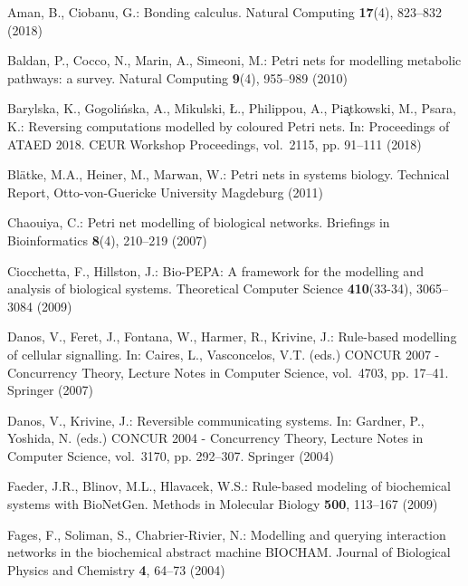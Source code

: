 \documentclass[runningheads]{llncs}
\begin{document}

\begin{thebibliography}{10}
\providecommand{\url}[1]{\texttt{#1}}
\providecommand{\urlprefix}{URL }
\providecommand{\doi}[1]{https://doi.org/#1}

Aman, B., Ciobanu, G.: Bonding calculus. Natural Computing  \textbf{17}(4),
  823--832 (2018)

Baldan, P., Cocco, N., Marin, A., Simeoni, M.: Petri nets for modelling
  metabolic pathways: a survey. Natural Computing  \textbf{9}(4),  955--989
  (2010)

Barylska, K., Gogoli\'{n}ska, A., Mikulski, {\L}., Philippou, A., Pi{\c
  a}tkowski, M., Psara, K.: Reversing computations modelled by coloured {P}etri
  nets. In: Proceedings of ATAED 2018. {CEUR} Workshop Proceedings, vol.~2115,
  pp. 91--111 (2018)

Bl{\"a}tke, M.A., Heiner, M., Marwan, W.: Petri nets in systems biology.
  Technical Report, Otto-von-Guericke University Magdeburg  (2011)

Chaouiya, C.: Petri net modelling of biological networks. Briefings in
  Bioinformatics  \textbf{8}(4),  210--219 (2007)

Ciocchetta, F., Hillston, J.: Bio-{PEPA}: A framework for the modelling and
  analysis of biological systems. Theoretical Computer Science
  \textbf{410}(33-34),  3065--3084 (2009)

Danos, V., Feret, J., Fontana, W., Harmer, R., Krivine, J.: Rule-based
  modelling of cellular signalling. In: Caires, L., Vasconcelos, V.T. (eds.)
  CONCUR 2007 - Concurrency Theory, Lecture Notes in Computer Science,
  vol.~4703, pp. 17--41. Springer (2007)

Danos, V., Krivine, J.: Reversible communicating systems. In: Gardner, P.,
  Yoshida, N. (eds.) CONCUR 2004 - Concurrency Theory, Lecture Notes in
  Computer Science, vol.~3170, pp. 292--307. Springer (2004)

Faeder, J.R., Blinov, M.L., Hlavacek, W.S.: {{R}ule-based modeling of
  biochemical systems with {B}io{N}et{G}en}. Methods in Molecular Biology
  \textbf{500},  113--167 (2009)

Fages, F., Soliman, S., Chabrier-Rivier, N.: Modelling and querying interaction
  networks in the biochemical abstract machine {BIOCHAM}. Journal of Biological
  Physics and Chemistry  \textbf{4},  64--73 (2004)


\end{thebibliography}
\end{document}
